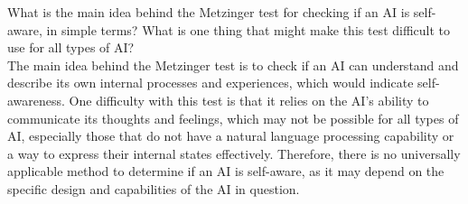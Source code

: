 \begin{ejercicio}
    What is the main idea behind the Metzinger test for checking if an AI is self-aware, in simple terms? What is one thing that might make this test difficult to use for all types of AI?\\

    The main idea behind the Metzinger test is to check if an AI can understand and describe its own internal processes and experiences, which would indicate self-awareness. One difficulty with this test is that it relies on the AI's ability to communicate its thoughts and feelings, which may not be possible for all types of AI, especially those that do not have a natural language processing capability or a way to express their internal states effectively. Therefore, there is no universally applicable method to determine if an AI is self-aware, as it may depend on the specific design and capabilities of the AI in question.
\end{ejercicio}